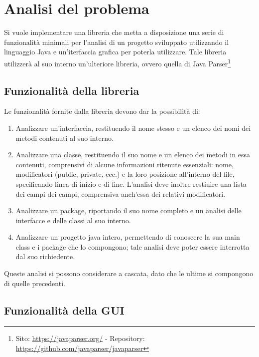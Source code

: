 \section{Analisi del problema}

Si vuole implementare una libreria che metta a disposizione una serie di funzionalità minimali per l'analisi di un progetto sviluppato utilizzando il linguaggio Java e un'iterfaccia grafica per poterla utilizzare. Tale libreria utilizzerà al suo interno un'ulteriore libreria, ovvero quella di Java Parser\footnote{Sito: \url{https://javaparser.org/} - Repository:  \url{https://github.com/javaparser/javaparser}}

\subsection{Funzionalità della libreria}
\label{subs:lib_goals}

Le funzionalità fornite dalla libreria devono dar la possibilità di:

\begin{enumerate}
    \item Analizzare un'interfaccia, restituendo il nome stesso e un elenco dei nomi dei metodi contenuti al suo interno.

    \item Analizzare una classe, restituendo il suo nome e un elenco dei metodi in essa contenuti, comprensivi di alcune informazioni ritenute essenziali: nome, modificatori (public, private, ecc.) e la loro posizione all'interno del file, specificando linea di inizio e di fine. L'analisi deve inoltre restiuire una lista dei campi dei campi, comprensiva anch'essa dei relativi modificatori.

    \item Analizzare un package, riportando il suo nome completo e un analisi delle interfacce e delle classi al suo interno.

    \item Analizzare un progetto java intero, permettendo di conoscere la sua main class e i package che lo compongono; tale analisi deve poter essere interrotta dal suo richiedente.
\end{enumerate}

Queste analisi si possono considerare a cascata, dato che le ultime si compongono di quelle precedenti.

\subsection{Funzionalità della GUI}
\label{subs:gui_goals}

